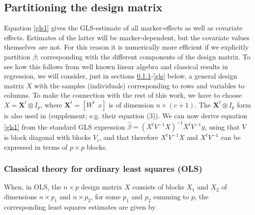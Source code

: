 \documentclass[12pt]{article}
\begin{document}
\subsection{Partitioning the design matrix}
	
Equation \eqref{gls1} gives the GLS-estimate of all marker-effects as well as covariate effects. Estimates of the latter will be marker-dependent, but the covariate values themselves are not. For this reason it is numerically more efficient if we explicitly partition $\beta$; corresponding with the different components of the design matrix. To see how this follows from well known linear algebra and classical results in regression, we will consider, just in sections \ref{ols}-\ref{gls} below, a general design matrix $X$ with the samples (individuals) corresponding to rows and variables to columns. To make the connection with the rest of this work, we have to choose $X = \mathbf{X}^t \otimes I_p$, where $\mathbf{X}^t = [W^t\: \:x]$ is of dimension $n \times (c+1)$. The $\mathbf{X}^t \otimes I_p$ form is also used in \cite{zhou_stephens_2014} (supplement; e.g. their equation (3)). We can now derive equation \eqref{gls1} from the   
standard GLS expression $\hat \beta = (X^t V^{-1} X)^{-1} X^t V^{-1} y$, using that $V$ is block diagonal with blocks $V_i$, and that therefore $X^t V^{-1} X$ and $X^t V^{-1}$ can be expressed in terms of $p \times p$ blocks. 



\subsubsection{Classical theory for ordinary least squares (OLS)} \label{ols}
	
When, in OLS, the $n \times p$ design matrix $X$ consists of blocks   
$X_1$ and $X_2$ of dimensions $n \times p_1$ and $n \times p_2$, for some $p_1$ and $p_2$ summing to $p$, the corresponding least squares estimates are given by 
\end{document}
